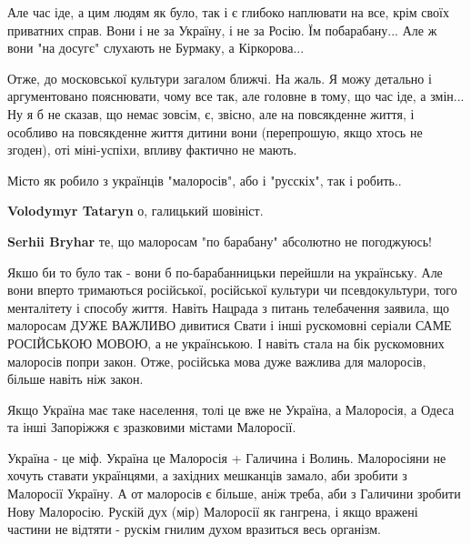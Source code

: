 \begin{itemize}
\begin{itemize}
Але час іде, а цим людям як було, так і є глибоко наплювати на все, крім своїх
приватних справ. Вони і не за Україну, і не за Росію. Їм побарабану... Але ж
вони "на досугє" слухають не Бурмаку, а Кіркорова... 

Отже, до московської культури загалом ближчі. На жаль. Я можу детально і
аргументовано пояснювати, чому все так, але головне в тому, що час іде, а
змін... Ну я б не сказав, що немає зовсім, є, звісно, але на повсякденне життя,
і особливо на повсякденне життя дитини вони (перепрошую, якщо хтось не згоден),
оті міні-успіхи, впливу фактично не мають. 

Місто як робило з українців "малоросів", або і "русскіх", так і робить..


 
\textbf{Volodymyr Tataryn} о, галицький шовініст.

 
\textbf{Serhii Bryhar} те, що малоросам "по барабану" абсолютно не погоджуюсь!

Якшо би то було так - вони б по-барабанницьки перейшли на українську. Але вони
вперто тримаються російської, російської культури чи псевдокультури, того
менталітету і способу життя. Навіть Нацрада з питань телебачення заявила, що
малоросам ДУЖЕ ВАЖЛИВО дивитися Свати і інші рускомовні серіали САМЕ РОСІЙСЬКОЮ
МОВОЮ, а не українською. І навіть стала на бік рускомовних малоросів попри
закон. Отже, російська мова дуже важлива для малоросів, більше навіть ніж
закон.

Якщо Україна має таке населення, толі це вже не Україна, а Малоросія, а Одеса
та інші Запоріжжя є зразковими містами Малоросії.

Україна - це міф. Україна це Малоросія + Галичина і Волинь. Малоросіяни не
хочуть ставати українцями, а західних мешканців замало, аби зробити з Малоросії
Україну. А от малоросів є більше, аніж треба, аби з Галичини зробити Нову
Малоросію. Рускій дух (мір) Малоросії як гангрена, і якщо вражені частини не
відтяти - рускім гнилим духом вразиться весь організм.


\end{itemize}
\end{itemize}
